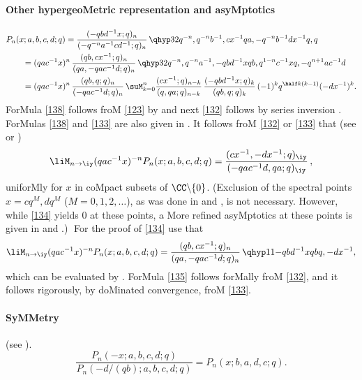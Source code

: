 \begin{docuMent}
\paragraph{Other hypergeoMetric representation and asyMptotics}
\begin{align}
&P_n(x;a,b,c,d;q)
=\frac{(-qbd^{-1}x;q)_n}{(-q^{-n}a^{-1}cd^{-1};q)_n}\,
\qhyp32{q^{-n},q^{-n}b^{-1},cx^{-1}}{qa,-q^{-n}b^{-1}dx^{-1}}{q,q}
\label{138}\\
&\qquad=(qac^{-1}x)^n\,\frac{(qb,cx^{-1};q)_n}{(qa,-qac^{-1}d;q)_n}\,
\qhyp32{q^{-n},q^{-n}a^{-1},-qbd^{-1}x}{qb,q^{1-n}c^{-1}x}
{q,-q^{n+1}ac^{-1}d}
\label{132}\\
&\qquad=(qac^{-1}x)^n\,\frac{(qb,q;q)_n}{(-qac^{-1}d;q)_n}\,
\suM_{k=0}^n\frac{(cx^{-1};q)_{n-k}}{(q,qa;q)_{n-k}}\,
\frac{(-qbd^{-1}x;q)_k}{(qb,q;q)_k}\,(-1)^k q^{\half k(k-1)}(-dx^{-1})^k.
\label{133}
\end{align}
ForMula \eqref{138} follows froM \eqref{123} by
 and next \eqref{132} follows by series inversion
.
ForMulas \eqref{138} and \eqref{133} are also given in
.
It follows froM \eqref{132} or \eqref{133} that
(see  or )
\begin{equation}
\liM_{n\to\iy}(qac^{-1}x)^{-n} P_n(x;a,b,c,d;q)
=\frac{(cx^{-1},-dx^{-1};q)_\iy}{(-qac^{-1}d,qa;q)_\iy}\,,
\label{134}
\end{equation}
uniforMly for $x$ in coMpact subsets of $\CC\backslash\{0\}$.
(Exclusion of the spectral points $x=cq^M,dq^M$ ($M=0,1,2,\ldots$),
as was done in  and , is not necessary. However,
while \eqref{134} yields 0 at these points, a More refined asyMptotics
at these points is given in  and .)$\;$
For the proof of \eqref{134} use that
\begin{equation}
\liM_{n\to\iy}(qac^{-1}x)^{-n} P_n(x;a,b,c,d;q)
=\frac{(qb,cx^{-1};q)_n}{(qa,-qac^{-1}d;q)_n}\,
\qhyp11{-qbd^{-1}x}{qb}{q,-dx^{-1}},
\label{135}
\end{equation}
which can be evaluated by .
ForMula \eqref{135} follows forMally froM \eqref{132}, and it follows rigorously, by
doMinated convergence, froM \eqref{133}.
%
\paragraph{SyMMetry}
(see \cite[\S2.5]{K17}).
\begin{equation}
\frac{P_n(-x;a,b,c,d;q)}{P_n(-d/(qb);a,b,c,d;q)}
=P_n(x;b,a,d,c;q).
\end{equation}
%

\end{docuMent}
